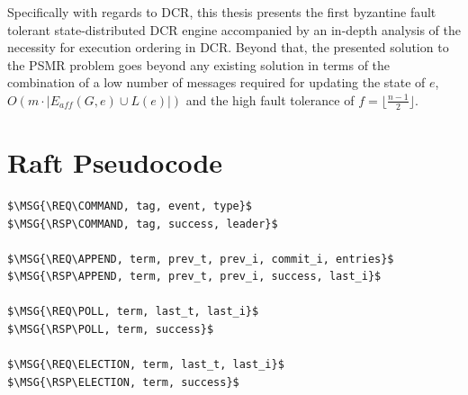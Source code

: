 \documentclass{article}
\begin{document}
	Specifically with regards to DCR, this thesis presents the first byzantine fault tolerant state-distributed DCR engine accompanied by an in-depth analysis of the necessity for execution ordering in DCR.
	Beyond that, the presented solution to the PSMR problem goes beyond any existing solution in terms of the combination of a low number of messages required for updating the state of $e$, $O(m \cdot |E_{aff}(G,e) \cup L(e)|)$ and the high fault tolerance of $f = \lfloor\frac{n-1}{2}\rfloor$.

	\newpage
	{}
	

	\newpage

	\appendix
	\section{Raft Pseudocode}
	\label{app:raft-pseudocode}
	\begin{mdframed}[backgroundcolor=Papyrus]
	\begin{lstlisting}[style=pseudo, caption={All message types.}]
$\MSG{\REQ\COMMAND, tag, event, type}$
$\MSG{\RSP\COMMAND, tag, success, leader}$

$\MSG{\REQ\APPEND, term, prev_t, prev_i, commit_i, entries}$
$\MSG{\RSP\APPEND, term, prev_t, prev_i, success, last_i}$

$\MSG{\REQ\POLL, term, last_t, last_i}$
$\MSG{\RSP\POLL, term, success}$

$\MSG{\REQ\ELECTION, term, last_t, last_i}$
$\MSG{\RSP\ELECTION, term, success}$
	\end{lstlisting}
	\end{mdframed}
\end{document}
